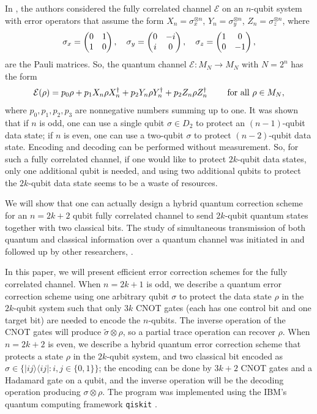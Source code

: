 \documentclass[11pt]{article}
\def\cE{{\mathcal E}}
\def\ra{{\rangle}}
\def\la{{\langle}}
\begin{document}
In \cite{LNPST}, the authors considered the fully correlated channel 
$\cE$ on an $n$-qubit system with error operators
that assume the form $X_n =\sigma_x^{\otimes n}$, 
$Y_n = \sigma_y^{\otimes n}$, 
$Z_n = \sigma_z^{\otimes n}$, where 
$$\sigma_x = \begin{pmatrix} 0 & 1 \cr 1 & 0 \cr\end{pmatrix}, \quad
\sigma_y = \begin{pmatrix} 0 & -i \cr i & 0 \cr\end{pmatrix}, \quad
\sigma_z = \begin{pmatrix} 1 & 0 \cr 0 & -1 \cr\end{pmatrix},$$
are the Pauli matrices.
So, the quantum channel $\cE: M_N\rightarrow M_N$
with $N = 2^n$ has the form 
\begin{equation}\label{cE}
\cE(\rho) = p_0 \rho + p_1 X_n \rho X_n^\dag + p_2 Y_n \rho Y_n^\dag + 
p_2 Z_n \rho Z_n^\dag \qquad \hbox{ for all } \rho \in M_N,
\end{equation}
where $p_0, p_1, p_2, p_3$ are nonnegative numbers summing up to one.
It was shown that if $n$ is odd, one can use a single qubit 
$\sigma \in D_2$ to protect an $(n-1)$-qubit data state;
if $n$ is even, one can use a two-qubit $\sigma$ to protect
$(n-2)$-qubit data state. Encoding and decoding can be 
performed without measurement.
So, for such a fully correlated channel, if one would like to protect
$2k$-qubit data states, only  one additional qubit is needed, and using 
two additional qubits to protect the $2k$-qubit data state
seems to be a waste of resources. 

We will show that one can actually design a hybrid quantum correction 
scheme for an $n = 2k+2$ qubit fully correlated channel to send
$2k$-qubit quantum states together with two classical bits.
The study of simultaneous transmission of both quantum and classical 
information over a quantum 
channel  was initiated in \cite{DS} and followed up by other researchers, 
\cite{HW1,HW2,GLZ}.


 
In this paper, we will present
efficient error correction schemes for the fully correlated channel.
When $n=2k+1$ is odd, we describe a quantum error correction scheme 
using one arbitrary qubit $\sigma$
to protect the data state $\rho$ in the $2k$-qubit system
such that only $3k$ CNOT gates (each has one control bit and one target bit) 
are needed
to encode the $n$-qubits. The inverse operation of the CNOT gates
will produce $\tilde \sigma \otimes \rho$, so a partial 
trace operation can recover $\rho$.
When $n = 2k+2$ is even, we describe a hybrid quantum error correction scheme
that protects a state $\rho$ in the $2k$-qubit system,
and two classical bit encoded as 
$\sigma \in \{|ij\ra \la ij|: i,j \in \{0,1\}\}$;
the encoding can be done by $3k+2$ CNOT gates and a Hadamard gate on a qubit,
and the inverse operation will be the decoding operation producing 
$\sigma \otimes \rho$.
The program was implemented using the IBM's quantum computing framework \verb|qiskit| \cite{qiskit}.
\end{document}
